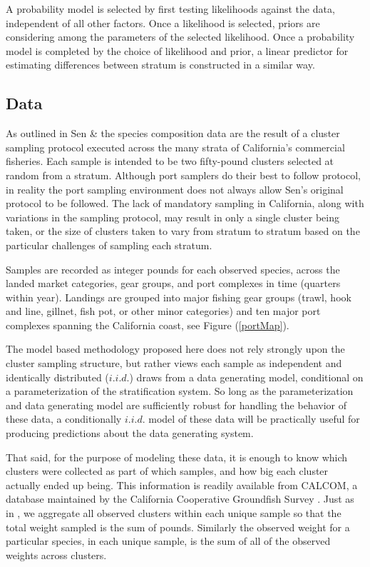 \documentclass[12pt]{article}
\begin{document}
%
A probability model is selected by first testing likelihoods against the data, 
independent of all other factors. Once a likelihood is selected, priors are 
considering among the parameters of the selected likelihood. Once a 
probability model is completed by the choice of likelihood and prior, a linear 
predictor for estimating differences between stratum is constructed in a 
similar way.



%
%
\subsection{Data}\label{data}
%
%

%
As outlined in Sen \citeyear{sen_sampling_1984} \& 
\citeyear{sen_methodological_1986} the species composition data are the 
result of a cluster sampling protocol executed across the many strata 
of California's commercial fisheries. Each sample is intended to be two 
fifty-pound clusters selected at random from a stratum. Although port samplers 
do their best to follow protocol, in reality the port sampling environment does 
not always allow Sen's original protocol to be followed. The lack of mandatory 
sampling in California, along with variations in the sampling protocol, may 
result in only a single cluster being taken, or the size of clusters taken to 
vary from stratum to stratum based on the particular challenges of sampling 
each stratum.

%
Samples are recorded as integer pounds for each observed species, across the 
landed market categories, gear groups, and port complexes in time (quarters 
within year). Landings are grouped into major fishing gear groups (trawl, hook 
and line, gillnet, fish pot, or other minor categories) and ten major port 
complexes spanning the California coast, see Figure (\ref{portMap}).

%
The model based methodology proposed here does not rely strongly upon
the cluster sampling structure, but rather views each sample as
independent and identically distributed (\(i.i.d.\)) draws from a data
generating model, conditional on a parameterization of the
stratification system. So long as the parameterization and data
generating model are sufficiently robust for handling the behavior of
these data, a conditionally \(i.i.d.\) model of these data will be
practically useful for producing predictions about the data generating
system.

%
That said, for the purpose of modeling these data, it is enough to know
which clusters were collected as part of which samples, and how big each
cluster actually ended up being. This information is readily available
from CALCOM, a database maintained by the California Cooperative
Groundfish Survey . Just as in 
, we aggregate all observed clusters within 
each unique sample so that the total weight sampled is the sum of pounds. 
Similarly the observed weight for a particular species, in each unique sample, 
is the sum of all of the observed weights across clusters.  
\end{document}
